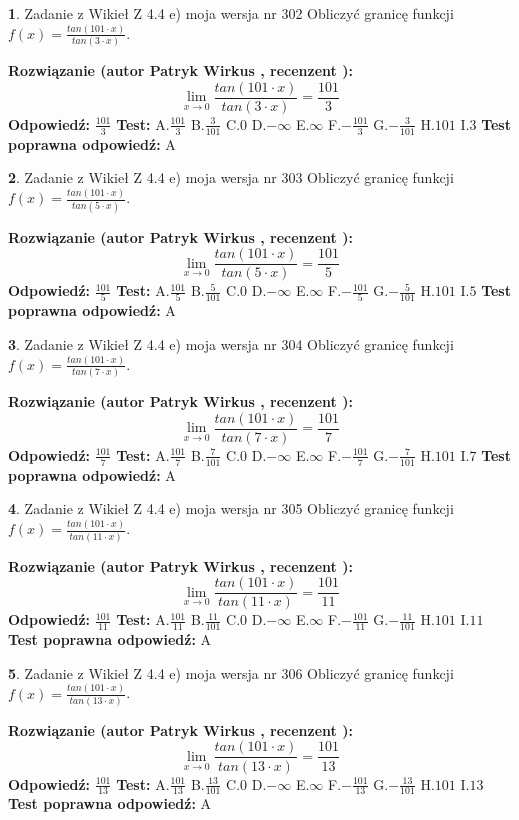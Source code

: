 \documentclass[12pt, a4paper]{article}
\theoremstyle{definition} %
\newtheorem{zad}{}
\newcommand{\zadStart}[1]{\begin{zad}#1\newline}
\newcommand{\zadStop}{\end{zad}}
\newcommand{\rozwStart}[2]{\noindent \textbf{Rozwiązanie (autor #1 , recenzent #2): }\newline}
\newcommand{\rozwStop}{\newline}
\newcommand{\odpStart}{\noindent \textbf{Odpowiedź:}\newline}
\newcommand{\odpStop}{\newline}
\newcommand{\testStart}{\noindent \textbf{Test:}\newline}
\newcommand{\testStop}{\newline}
\newcommand{\kluczStart}{\noindent \textbf{Test poprawna odpowiedź:}\newline}
\newcommand{\kluczStop}{\newline}
\begin{document}
\zadStart{Zadanie z Wikieł Z 4.4 e) moja wersja nr 302}
Obliczyć granicę funkcji $f(x)=\frac{tan(101\cdot x)}{tan(3\cdot x)}$.
\zadStop
\rozwStart{Patryk Wirkus}{}
$$\lim\limits_{x\to 0}\frac{tan(101\cdot x)}{tan(3\cdot x)}=
\frac{101}{3}$$
\rozwStop
\odpStart
$\frac{101}{3}$
\odpStop
\testStart
A.$\frac{101}{3}$
B.$\frac{3}{101}$
C.$0$
D.$-\infty$
E.$\infty$
F.$-\frac{101}{3}$
G.$-\frac{3}{101}$
H.$101$
I.$3$
\testStop
\kluczStart
A
\kluczStop



\zadStart{Zadanie z Wikieł Z 4.4 e) moja wersja nr 303}
Obliczyć granicę funkcji $f(x)=\frac{tan(101\cdot x)}{tan(5\cdot x)}$.
\zadStop
\rozwStart{Patryk Wirkus}{}
$$\lim\limits_{x\to 0}\frac{tan(101\cdot x)}{tan(5\cdot x)}=
\frac{101}{5}$$
\rozwStop
\odpStart
$\frac{101}{5}$
\odpStop
\testStart
A.$\frac{101}{5}$
B.$\frac{5}{101}$
C.$0$
D.$-\infty$
E.$\infty$
F.$-\frac{101}{5}$
G.$-\frac{5}{101}$
H.$101$
I.$5$
\testStop
\kluczStart
A
\kluczStop



\zadStart{Zadanie z Wikieł Z 4.4 e) moja wersja nr 304}
Obliczyć granicę funkcji $f(x)=\frac{tan(101\cdot x)}{tan(7\cdot x)}$.
\zadStop
\rozwStart{Patryk Wirkus}{}
$$\lim\limits_{x\to 0}\frac{tan(101\cdot x)}{tan(7\cdot x)}=
\frac{101}{7}$$
\rozwStop
\odpStart
$\frac{101}{7}$
\odpStop
\testStart
A.$\frac{101}{7}$
B.$\frac{7}{101}$
C.$0$
D.$-\infty$
E.$\infty$
F.$-\frac{101}{7}$
G.$-\frac{7}{101}$
H.$101$
I.$7$
\testStop
\kluczStart
A
\kluczStop



\zadStart{Zadanie z Wikieł Z 4.4 e) moja wersja nr 305}
Obliczyć granicę funkcji $f(x)=\frac{tan(101\cdot x)}{tan(11\cdot x)}$.
\zadStop
\rozwStart{Patryk Wirkus}{}
$$\lim\limits_{x\to 0}\frac{tan(101\cdot x)}{tan(11\cdot x)}=
\frac{101}{11}$$
\rozwStop
\odpStart
$\frac{101}{11}$
\odpStop
\testStart
A.$\frac{101}{11}$
B.$\frac{11}{101}$
C.$0$
D.$-\infty$
E.$\infty$
F.$-\frac{101}{11}$
G.$-\frac{11}{101}$
H.$101$
I.$11$
\testStop
\kluczStart
A
\kluczStop



\zadStart{Zadanie z Wikieł Z 4.4 e) moja wersja nr 306}
Obliczyć granicę funkcji $f(x)=\frac{tan(101\cdot x)}{tan(13\cdot x)}$.
\zadStop
\rozwStart{Patryk Wirkus}{}
$$\lim\limits_{x\to 0}\frac{tan(101\cdot x)}{tan(13\cdot x)}=
\frac{101}{13}$$
\rozwStop
\odpStart
$\frac{101}{13}$
\odpStop
\testStart
A.$\frac{101}{13}$
B.$\frac{13}{101}$
C.$0$
D.$-\infty$
E.$\infty$
F.$-\frac{101}{13}$
G.$-\frac{13}{101}$
H.$101$
I.$13$
\testStop
\kluczStart
A
\kluczStop
\end{document}
